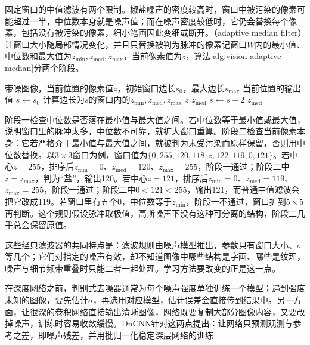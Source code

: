 固定窗口的中值滤波有两个限制。椒盐噪声的密度较高时，窗口中被污染的像素可能超过一半，中位数本身就是噪声值；而在噪声密度较低时，它仍会替换每个像素，包括没有被污染的像素，细小笔画因此变细或断开。（adaptive median filter）让窗口大小随局部情况变化，并且只替换被判为脉冲的像素记窗口$W$内的最小值、中位数和最大值为$z_{\min},z_{\mathrm{med}},z_{\max}$，当前像素值为$z$，算法\ref{alg:vision-adaptive-median}分两个阶段。

\begin{algorithm}
 \label{alg:vision-adaptive-median}
 \begin{algorithmic}[1]
  \Require 带噪图像，当前位置的像素值$z$，初始窗口边长$s_0$，最大边长$s_{\max}$
  \Ensure 当前位置的输出值
  \State $s\gets s_0$
  \Loop
   \State 计算边长为$s$的窗口内的$z_{\min},z_{\mathrm{med}},z_{\max}$
     \State \Return $z$ 
    \Else
     \State \Return $z_{\mathrm{med}}$
    \EndIf
   \EndIf
   \State $s\gets s+2$
    \State \Return $z_{\mathrm{med}}$ 
   \EndIf
  \EndLoop
 \end{algorithmic}
\end{algorithm}

阶段一检查中位数是否落在最小值与最大值之间。若中位数等于最小值或最大值，说明窗口里的脉冲太多，中位数不可靠，就扩大窗口重算。阶段二检查当前像素本身：它若严格介于最小值与最大值之间，就被判为未受污染而原样保留，否则用中位数替换。以$3\times3$窗口为例，窗口值为$\{0,255,120,118,z,122,119,0,121\}$。若中心$z=255$，排序后$z_{\min}=0$、$z_{\mathrm{med}}=120$、$z_{\max}=255$，阶段一通过；阶段二中$z=z_{\max}$，判为“盐”，输出120。若中心$z=121$，排序后$z_{\min}=0$、$z_{\mathrm{med}}=119$、$z_{\max}=255$，阶段一通过；阶段二中$0<121<255$，输出121，而普通中值滤波会把它改成119。若窗口里有五个0，中位数等于$z_{\min}$，阶段一不通过，窗口扩到$5\times5$再判断。这个规则假设脉冲取极值，高斯噪声下没有这种可分离的结构，阶段二几乎总会保留原值。

这些经典滤波器的共同特点是：滤波规则由噪声模型推出，参数只有窗口大小、$\sigma$等几个；它们对指定的噪声有效，却不知道图像中哪些结构是字画、哪些是纹理，噪声与细节频带重叠时只能二者一起处理。学习方法要改变的正是这一点。

在深度网络之前，判别式去噪器通常为每个噪声强度单独训练一个模型；遇到强度未知的图像，要先估计$\sigma$，再选用对应模型，估计误差会直接传到结果中。另一方面，让很深的卷积网络直接输出清晰图像，网络既要复制大部分图像内容，又要改掉噪声，训练时容易收敛缓慢。DnCNN针对这两点提出：让网络只预测观测与参考之差，即噪声残差，并用批归一化稳定深层网络的训练

